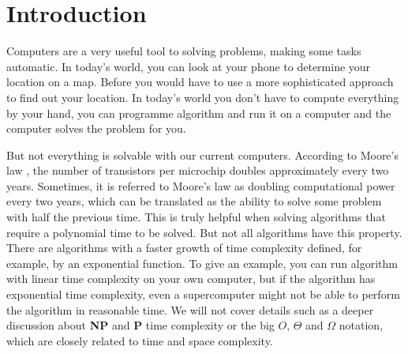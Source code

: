 \chapter{Introduction} \label{introduction}
%
%
%
%
%
%
Computers are a very useful tool to solving problems, making some tasks automatic. In today's world, you can look at your phone to determine your location on a map. Before you would have to use a more sophisticated approach to find out your location. In today's world you don't have to compute everything by your hand, you can programme algorithm and run it on a computer and the computer solves the problem for you. 

But not everything is solvable with our current computers. According to Moore's law \cite{moore:1965}, the number of transistors per microchip doubles approximately every two years. Sometimes, it is referred to Moore's law as doubling computational power every two years, which can be translated as the ability to solve some problem with half the previous time. This is truly helpful when solving algorithms that require a polynomial time to be solved. But not all algorithms have this property. There are algorithms with a faster growth of time complexity defined, for example, by an exponential function. To give an example, you can run algorithm with linear time complexity on your own computer, but if the algorithm has exponential time complexity, even a supercomputer might not be able to perform the algorithm in reasonable time. We will not cover details such as a deeper discussion about \textbf{NP} and \textbf{P} time complexity or the big $O$, $\Theta$ and $\Omega$ notation, which are closely related to time and space complexity. 

